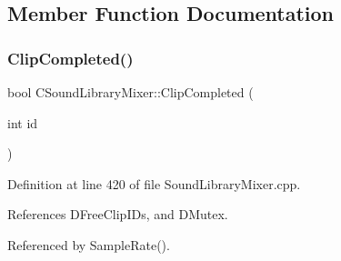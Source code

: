 \subsection{Member Function Documentation}
\hypertarget{classCSoundLibraryMixer_acd11bc59b6f11b1a8e1f0e821f0b8207}{}\label{classCSoundLibraryMixer_acd11bc59b6f11b1a8e1f0e821f0b8207} 
\subsubsection{\texorpdfstring{Clip\+Completed()}{ClipCompleted()}}
{\footnotesize\ttfamily bool C\+Sound\+Library\+Mixer\+::\+Clip\+Completed (\begin{DoxyParamCaption}\item[{int}]{id }\end{DoxyParamCaption})}



Definition at line 420 of file Sound\+Library\+Mixer.\+cpp.



References D\+Free\+Clip\+I\+Ds, and D\+Mutex.



Referenced by Sample\+Rate().


